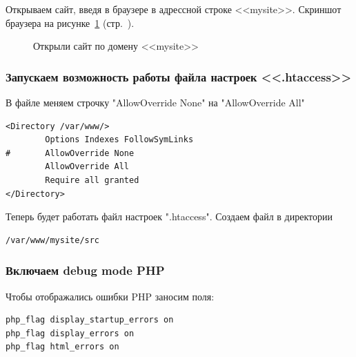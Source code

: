 Открываем сайт, введя в браузере в адрессной строке <<mysite>>.
Скриншот браузера на рисунке~\ref{fig:browser-mysite} (стр.~\pageref{fig:browser-mysite}).

\begin{figure}[tp]
    \caption{Открыли сайт по домену <<mysite>>}
    \label{fig:browser-mysite}
\end{figure}

\newpage


\subsubsection{Запускаем возможность работы файла настроек <<.htaccess>>}

В файле меняем строчку "AllowOverride None" на "AllowOverride All"

\begin{verbatim}
<Directory /var/www/>
        Options Indexes FollowSymLinks
#       AllowOverride None
        AllowOverride All
        Require all granted
</Directory>
\end{verbatim}

Теперь будет работать файл настроек ".htaccess". Создаем файл в директории

\begin{verbatim}
/var/www/mysite/src
\end{verbatim}

\subsubsection{Включаем debug mode PHP}

Чтобы отображались ошибки PHP заносим поля:

\begin{verbatim}
php_flag display_startup_errors on
php_flag display_errors on
php_flag html_errors on
\end{verbatim}

